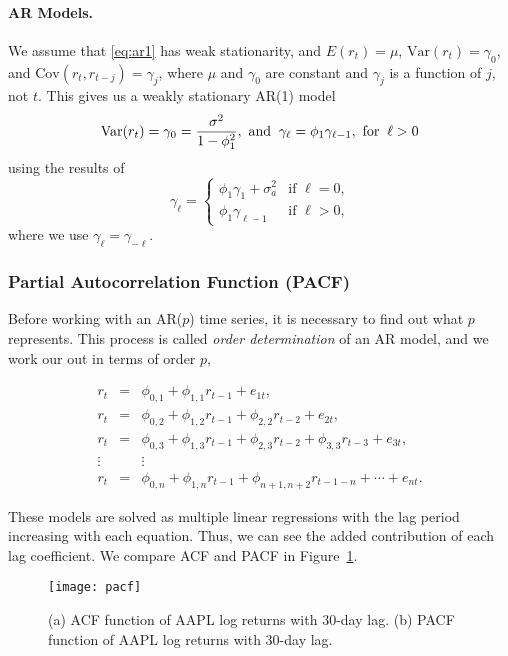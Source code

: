 \paragraph{AR Models.} We assume that \eqref{eq:ar1} has weak stationarity, and $E(r_t)=\mu$, $\text{Var}(r_t)=\gamma_0$, and $\text{Cov}(r_t,r_{t-j})=\gamma_j$, where $\mu$ and $\gamma_0$ are constant and $\gamma_j$ is a function of $j$, not $t$. This gives us a weakly stationary AR(1) model
\[
\text{Var}(r_t) = \gamma_0=\frac{\sigma^2}{1-\phi^2_1}, \text{ and \:} \gamma_{\ell}=\phi_1\gamma_{\ell-1}, \text{ for \:} \ell>0
\]
using the results of
\[
\gamma_{\ell} =
	\begin{cases}
	\phi_1 \gamma_1 + \sigma^2_a & \text{if $\ell=0$,} \\
	\phi_1 \gamma_{\ell-1} & \text{if $\ell>0$,}
	\end{cases}
\]
where we use $\gamma_{\ell}=\gamma_{-\ell}$. 

\subsubsection{Partial Autocorrelation Function (PACF)}
Before working with an AR($p$) time series, it is necessary to find out what $p$ represents. This process is called \emph{order determination} of an AR model, and we work our out in terms of order $p$,

\begin{eqnarray*}
r_t &=& \phi_{0,1} + \phi_{1,1} r_{t-1} + e_{1t}, \\
r_t &=& \phi_{0,2} + \phi_{1,2} r_{t-1} + \phi_{2,2} r_{t-2} + e_{2t}, \\
r_t &=& \phi_{0,3} + \phi_{1,3} r_{t-1} + \phi_{2,3} r_{t-2} + \phi_{3,3} r_{t-3} + e_{3t}, \\
\vdots && \vdots \\
r_t &=& \phi_{0,n} + \phi_{1,n} r_{t-1} + \phi_{n+1,n+2} r_{t-1-n} + \cdots + e_{nt}.
\end{eqnarray*}

These models are solved as multiple linear regressions with the lag period increasing with each equation. Thus, we can see the added contribution of each lag coefficient. We compare ACF and PACF in Figure~\ref{figure:pacf}.

\begin{figure}[tb]
  \centering
  \texttt{[image: pacf]}
  \caption[Comparing ACF with PACF]{(a) ACF function of AAPL log returns with 30-day lag. (b) PACF function of AAPL log returns with 30-day lag.}
  \label{figure:pacf}
\end{figure}


